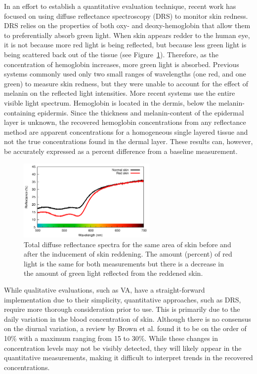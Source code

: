 In an effort to establish a quantitative evaluation technique, recent work has focused on using diffuse reflectance spectroscopy (DRS) to monitor skin redness. DRS relies on the properties of both oxy- and deoxy-hemoglobin that allow them to preferentially absorb green light. When skin appears redder to the human eye, it is not because more red light is being reflected, but because less green light is being scattered back out of the tissue (see Figure~\ref{fig:p4-drs_example}). Therefore, as the concentration of hemoglobin increases, more green light is absorbed. Previous systems commonly used only two small ranges of wavelengths (one red, and one green) to measure skin redness,\cite{Pearse1990,Dawson1980,Diffey1984,Feather1988} but they were unable to account for the effect of melanin on the reflected light intensities. More recent systems use the entire visible light spectrum.\cite{Stamatas2008,Yohan2014,Kollias2010} Hemoglobin is located in the dermis, below the melanin-containing epidermis. Since the thickness and melanin-content of the epidermal layer is unknown, the recovered hemoglobin concentrations from any reflectance method are apparent concentrations for a homogeneous single layered tissue and not the true concentrations found in the dermal layer. These results can, however, be accurately expressed as a percent difference from a baseline measurement.

\begin{figure}
	\centering \includegraphics[width=0.6\textwidth]{figures/p4-drs_example.png}
	\caption[Example of the diffuse reflectance spectra for normal and red skin]{\label{fig:p4-drs_example}Total diffuse reflectance spectra for the same area of skin before and after the inducement of skin reddening. The amount (percent) of red light is the same for both measurements but there is a decrease in the amount of green light reflected from the reddened skin.}
\end{figure}

While qualitative evaluations, such as VA, have a straight-forward implementation due to their simplicity, quantitative approaches, such as DRS, require more thorough consideration prior to use. This is primarily due to the daily variation in the blood concentration of skin. Although there is no consensus on the diurnal variation, a review by Brown et al. found it to be on the order of 10\% with a maximum ranging from 15 to 30\%.\cite{Brown1946} While these changes in concentration levels may not be visibly detected, they will likely appear in the quantitative measurements, making it difficult to interpret trends in the recovered concentrations.

